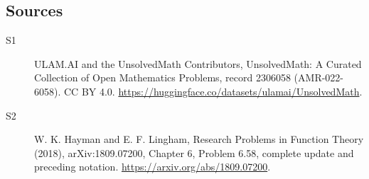 \documentclass[11pt]{article}
\begin{document}
\subsection{Sources}
\begin{description}
\item[\hypertarget{source:2306058:1}{S1}] ULAM.AI and the UnsolvedMath Contributors, UnsolvedMath: A Curated Collection of Open Mathematics Problems, record 2306058 (AMR-022-6058). CC BY 4.0. \url{https://huggingface.co/datasets/ulamai/UnsolvedMath}.
\item[\hypertarget{source:2306058:2}{S2}] W. K. Hayman and E. F. Lingham, Research Problems in Function Theory (2018), arXiv:1809.07200, Chapter 6, Problem 6.58, complete update and preceding notation. \url{https://arxiv.org/abs/1809.07200}.
\end{description}
\label{end:2306058}
\end{document}
